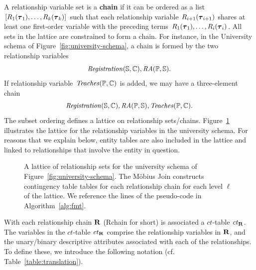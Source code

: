 \documentclass{acm_proc_article-sp}
\newcommand{\ct}{\mathit{ct}}
\begin{document}
A relationship variable set is a \textbf{chain} if it can be ordered as a list $[R_{1}(\boldsymbol{\tau}_{1}),\ldots,R_{k}(\boldsymbol{\tau}_{k})]$ 
such that each relationship variable $R_{i+1}(\boldsymbol{\tau}_{i+1})$ shares at least one first-order variable with the preceding terms $R_{1}(\boldsymbol{\tau}_{1}),\ldots,R_{i}(\boldsymbol{\tau}_{i})$.
All sets in the lattice are constrained to form a chain.
%
For instance, in the University schema of Figure~\ref{fig:university-schema}, a %
chain is formed by the two relationship variables
\[\mathit{Registration}(\mathbb{S},\mathbb{C}),\mathit{RA}(\mathbb{P},\mathbb{S}).\]
If relationship variable $\it{Teaches}(\mathbb{P},\mathbb{C})$ is added,
we may have a three-element chain \[\mathit{Registration}(\mathbb{S},\mathbb{C}),\mathit{RA}(\mathbb{P},\mathbb{S}),\it{Teaches}(\mathbb{P},\mathbb{C}).\] 
The subset ordering defines a lattice on relationship sets/chains. 
Figure~\ref{fig:big-lattice} illustrates the  lattice for the relationship variables in the university schema. 
For reasons that we explain below, entity tables are also included in the lattice and linked to relationships that involve the entity in question. 
\begin{figure}[htbp]
\begin{center}

\caption{A lattice of relationship sets for the university schema of Figure~\ref{fig:university-schema}. The M\"obius Join constructs contingency table tables for each relationship chain for each level $\ell$ of the lattice. We reference the lines of the pseudo-code in Algorithm~\ref{alg:fmt}.
\label{fig:big-lattice}}
\end{center}
\end{figure}
%
With each relationship chain $\mathbf{R}$ (Rchain for short) is associated a $\ct$-table $\ct_{\set{\Relation}}$. 
The variables in the $\ct$-table  $\ct_{\set{\Relation}}$ %
 comprise the relationship variables  in $\mathbf{R}$, and the unary/binary descriptive attributes associated with each of the relationships. To define these, we introduce the following notation (cf. Table~\ref{table:translation}).
\end{document}
